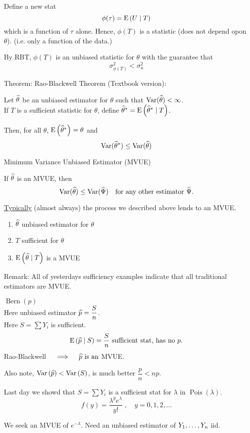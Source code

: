 \nl Define a new stat
$$\phi(\tau) = \E{U \mid T}$$
which is a function of $\tau$ alone. Hence, $\phi(T)$ is a statistic (does not depend opon $\theta$). (i.e. only a function of the data.)

\nl By RBT, $\phi(T)$ is an unbiased statistic for $\theta$ with the guarantee that
$$\sigma^2_{\phi(T)} < \sigma^2_u$$

\nnl Theorem: Rao-Blackwell Theorem (Textbook version):

\noindent Let $\widehat{\theta}$ be an unbiased estimator for $\theta$ such that $\Var*{\that} < \infty$.\\If $T$ is a sufficient statistic for $\theta$, define $\that^* = \E{\that^* \mid T}$.

\nl Then, for all $\theta$, $\E{\that^*}= \theta$ and
$$\Var*{\that^*} \leq \Var*{\that}$$

\disc Minimum Variance Unbiased Estimator (MVUE)

\nl If $\widehat{\theta}$ is an MVUE, then
$$\Var*{\that} \leq \Var*{\Psihat} \quad \text{for any other estimator } \Psihat.$$

\nl \underline{Typically} (almost always) the process we described above lends to an MVUE.

\begin{enumerate}[label=\textcircled{\raisebox{-1pt}{\arabic*}}]
    \item $\widehat{\theta}$ unbiased estimator for $\theta$
    \item $T$ sufficient for $\theta$
    \item $\E{\that \mid T}$ is a MVUE
\end{enumerate}

\nl Remark: All of yesterdays sufficiency examples indicate that all traditional estimators are MVUE.

\example $\operatorname{Bern}(p)$\\
Here unbiased estimator $\widehat{p} = \dfrac{S}{n}$.\\
Here $S = \sum Y_i$ is sufficient.
$$\E{\phat\mid S} = \frac{S}{n} \text{ sufficient stat, has no } p.$$
Rao-Blackwell $\quad \implies \quad \widehat{p} \text{ is an}$ MVUE.

\nl Also note, $\Var{\phat} < \Var{S}$, is much better $\dfrac{p}{n} < np$.

\example Last day we showd that $S = \sum Y_i$ is a sufficient stat for $\lambda$ in $\operatorname{Pois}(\lambda)$.
$$f(y) = \frac{\lambda^ye^{\lambda}}{y!}\;, \quad y = 0, 1, 2, \dots$$

\nl We seek an MVUE of $e^{-\lambda}$. Need an unbiased estimator of ${Y}_1, \dots, {Y}_n$ iid.

